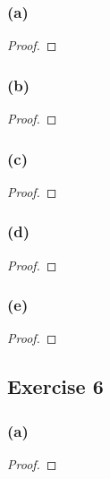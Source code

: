 \documentclass[14pt]{extarticle}
\begin{document}
\subsubsection{(a)}

\begin{proof}

\end{proof}

\subsubsection{(b)}

\begin{proof}

\end{proof}

\subsubsection{(c)}

\begin{proof}

\end{proof}

\subsubsection{(d)}

\begin{proof}

\end{proof}

\subsubsection{(e)}

\begin{proof}

\end{proof}

\subsection{Exercise 6}

\subsubsection{(a)}

\begin{proof}

\end{proof}
\end{document}
